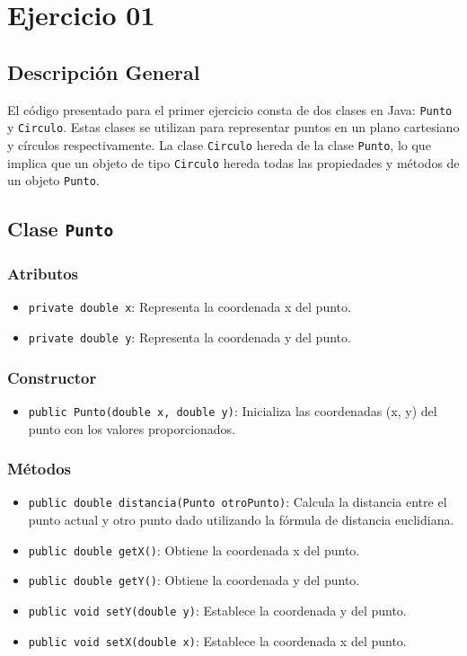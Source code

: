 
\section{Ejercicio 01}

\subsection{Descripción General}
El código presentado para el primer ejercicio consta de dos clases en Java: \texttt{Punto} y \texttt{Circulo}. Estas clases se utilizan para representar puntos en un plano cartesiano y círculos respectivamente. La clase \texttt{Circulo} hereda de la clase \texttt{Punto}, lo que implica que un objeto de tipo \texttt{Circulo} hereda todas las propiedades y métodos de un objeto \texttt{Punto}.

\subsection{Clase \texttt{Punto}}
\subsubsection{Atributos}
\begin{itemize}
    \item \texttt{private double x}: Representa la coordenada x del punto.
    \item \texttt{private double y}: Representa la coordenada y del punto.
\end{itemize}

\subsubsection{Constructor}
\begin{itemize}
    \item \texttt{public Punto(double x, double y)}: Inicializa las coordenadas (x, y) del punto con los valores proporcionados.
\end{itemize}

\subsubsection{Métodos}
\begin{itemize}
    \item \texttt{public double distancia(Punto otroPunto)}: Calcula la distancia entre el punto actual y otro punto dado utilizando la fórmula de distancia euclidiana.
    \item \texttt{public double getX()}: Obtiene la coordenada x del punto.
    \item \texttt{public double getY()}: Obtiene la coordenada y del punto.
    \item \texttt{public void setY(double y)}: Establece la coordenada y del punto.
    \item \texttt{public void setX(double x)}: Establece la coordenada x del punto.
\end{itemize}

